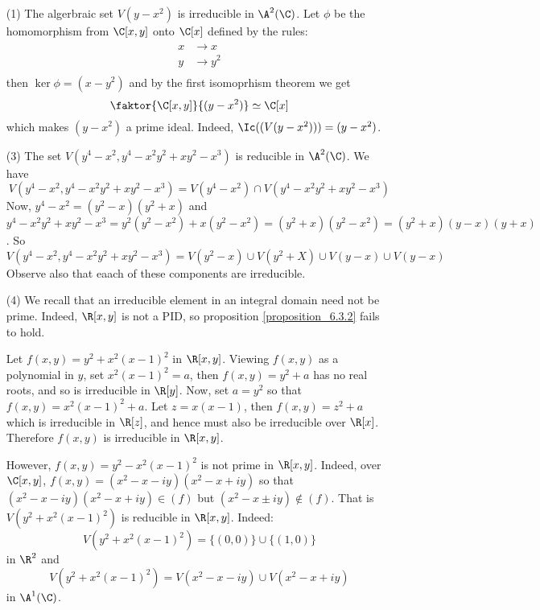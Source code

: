 \begin{example}\label{example_10.5}
  \begin{enumerate}
    \item[(1)] The algerbraic set $V(y-x^2)$ is irreducible in
      $\A^2(\C)$. Let $\phi$ be the homomorphism from $\C[x,y]$ onto
      $\C[x]$ defined by the rules:
      \begin{align*}
        x & \xrightarrow{} x \\
        y & \xrightarrow{} y^2 \\
      \end{align*}
      then $\ker{\phi}=(x-y^2)$ and by the first isomoprhism theorem
      we get
      \begin{equation*}
        \faktor{\C[x,y]}{(y-x^2)} \simeq \C[x]
      \end{equation*}
      which makes $(y-x^2)$ a prime ideal. Indeed,
      $\Ic((V(y-x^2)))=(y-x^2)$.

    \item[(3)] The set $V(y^4-x^2, y^4-x^2y^2+xy^2-x^3)$ is reducible
      in $\A^2(\C)$. We have
      \begin{equation*}
        V(y^4-x^2, y^4-x^2y^2+xy^2-x^3)=
        V(y^4-x^2) \cap V(y^4-x^2y^2+xy^2-x^3)
      \end{equation*}
      Now, $y^4-x^2=(y^2-x)(y^2+x)$ and $y^4-x^2y^2+xy^2-x^3=
      y^2(y^2-x^2)+x(y^2-x^2)=(y^2+x)(y^2-x^2)=(y^2+x)(y-x)(y+x)$. So
      \begin{equation*}
        V(y^4-x^2, y^4-x^2y^2+xy^2-x^3)=
        V(y^2-x) \cup V(y^2+X) \cup V(y-x) \cup V(y-x)
      \end{equation*}
      Observe also that eaach of these components are irreducible.

    \item[(4)] We recall that an irreducible element in an integral
      domain need not be prime. Indeed, $\R[x,y]$ is not a PID, so
      proposition \ref{proposition_6.3.2} fails to hold.

      Let $f(x,y)=y^2+x^2(x-1)^2$ in $\R[x,y]$. Viewing $f(x,y)$ as a
      polynomial in $y$, set $x^2(x-1)^2=a$, then $f(x,y)=y^2+a$ has
      no real roots, and so is irreducible in $\R[y]$. Now, set
      $a=y^2$ so that $f(x,y)=x^2(x-1)^2+a$. Let $z=x(x-1)$, then
      $f(x,y)=z^2+a$ which is irreducible in $\R[z]$, and hence must
      also be irreducible over $\R[x]$. Therefore $f(x,y)$ is
      irreducible in $\R[x,y]$.

      However, $f(x,y)=y^2-x^2(x-1)^2$ is not prime in $\R[x,y]$.
      Indeed, over $\C[x,y]$, $f(x,y)=(x^2-x-iy)(x^2-x+iy)$ so that
      $(x^2-x-iy)(x^2-x+iy) \in (f)$ but $(x^2-x \pm iy) \notin (f)$.
      That is $V(y^2+x^2(x-1)^2)$ is reducible in $\R[x,y]$. Indeed:
      \begin{equation*}
        V(y^2+x^2(x-1)^2)=\{(0,0)\} \cup \{(1,0)\}
      \end{equation*}
      in $\R^2$ and
      \begin{equation*}
        V(y^2+x^2(x-1)^2)=V(x^2-x-iy) \cup V(x^2-x+iy)
      \end{equation*}
      in $\A^1(\C)$.


\end{enumerate}
\end{example}
